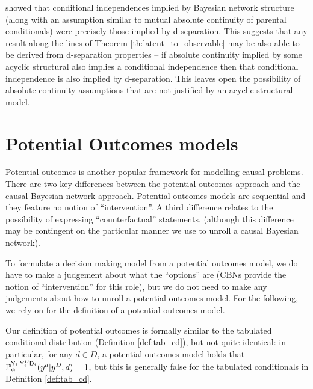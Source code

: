 \citet{meek_strong_1995} showed that conditional independences implied by Bayesian network structure (along with an assumption similar to mutual absolute continuity of parental conditionals) were precisely those implied by d-separation. This suggests that any result along the lines of Theorem \ref{th:latent_to_observable} may be also able to be derived from d-separation properties -- if absolute continuity implied by some acyclic structural also implies a conditional independence then that conditional independence is also implied by d-separation. This leaves open the possibility of absolute continuity assumptions that are not justified by an acyclic structural model.

\section{Potential Outcomes models}\label{sec:potential_outcomes}

Potential outcomes is another popular framework for modelling causal problems. There are two key differences between the potential outcomes approach and the causal Bayesian network approach. Potential outcomes models are sequential and they feature no notion of ``intervention''. A third difference relates to the possibility of expressing ``counterfactual'' statements, (although this difference may be contingent on the particular manner we use to unroll a causal Bayesian network).

To formulate a decision making model from a potential outcomes model, we do have to make a judgement about what the ``options'' are (CBNs provide the notion of ``intervention'' for this role), but we do not need to make any judgements about how to unroll a potential outcomes model. For the following, we rely on \citet{rubin_causal_2005} for the definition of a potential outcomes model.

Our definition of potential outcomes is formally similar to the tabulated conditional distribution (Definition \ref{def:tab_cd}), but not quite identical: in particular, for any $d\in D$, a potential outcomes model holds that $\mathbb{P}_\alpha^{\mathsf{Y}_i|\mathsf{Y}^D_i\mathsf{D}_i}(y^d|y^D,d)=1$, but this is generally false for the tabulated conditionals in Definition \ref{def:tab_cd}.

